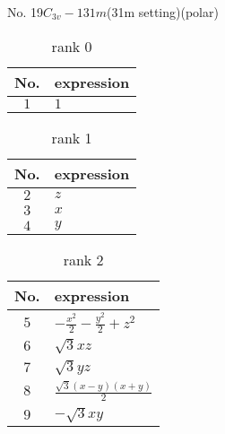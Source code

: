 \documentclass[fleqn,8pt,landscape]{jsarticle}
\begin{document}
\setcounter{MaxMatrixCols}{16}

\begin{center}
\LARGE
No. 19\quad$C_{3v}-1$\quad$31m$\quad(31m setting)\quad[ trigonal ] (polar)
\end{center}
\begin{table}[ht!]
\begin{center}
\caption{rank 0}
\renewcommand{\arraystretch}{1.3}
\begin{tabular}{cl} \hline \hline
No. & expression \\ \hline
$ 1 $ & $ 1 $ \\
 \hline \hline
\end{tabular}
\end{center}
\end{table}
\begin{table}[ht!]
\begin{center}
\caption{rank 1}
\renewcommand{\arraystretch}{1.3}
\begin{tabular}{cl} \hline \hline
No. & expression \\ \hline
$ 2 $ & $ z $ \\
$ 3 $ & $ x $ \\
$ 4 $ & $ y $ \\
 \hline \hline
\end{tabular}
\end{center}
\end{table}
\begin{table}[ht!]
\begin{center}
\caption{rank 2}
\renewcommand{\arraystretch}{1.3}
\begin{tabular}{cl} \hline \hline
No. & expression \\ \hline
$ 5 $ & $ - \frac{x^{2}}{2} - \frac{y^{2}}{2} + z^{2} $ \\
$ 6 $ & $ \sqrt{3} x z $ \\
$ 7 $ & $ \sqrt{3} y z $ \\
$ 8 $ & $ \frac{\sqrt{3} \left(x - y\right) \left(x + y\right)}{2} $ \\
$ 9 $ & $ - \sqrt{3} x y $ \\
 \hline \hline
\end{tabular}
\end{center}
\end{table}
\end{document}
